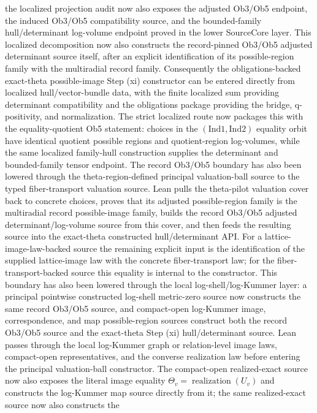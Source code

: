 \documentclass[11pt]{article}
\theoremstyle{plain}
\theoremstyle{definition}
\theoremstyle{remark}
\begin{document}
the localized projection audit now also exposes the adjusted Ob3/Ob5 endpoint,
the induced Ob3/Ob5 compatibility source, and the bounded-family
hull/determinant log-volume endpoint proved in the lower SourceCore layer.
This localized decomposition now also constructs the record-pinned Ob3/Ob5
adjusted determinant source itself, after an explicit identification of its
possible-region family with the multiradial record family.  Consequently the
obligations-backed exact-theta possible-image Step (xi) constructor can be
entered directly from localized hull/vector-bundle data, with the finite
localized sum providing determinant compatibility and the obligations package
providing the bridge, q-positivity, and normalization.
The strict localized route now packages this with the equality-quotient Ob5
statement: choices in the \((\mathrm{Ind}1,\mathrm{Ind}2)\) equality orbit
have identical quotient possible regions and quotient-region log-volumes, while
the same localized family-hull construction supplies the determinant and
bounded-family tensor endpoint.
The record Ob3/Ob5 boundary has also been lowered through the
theta-region-defined principal valuation-ball source to the typed
fiber-transport valuation source.  Lean pulls the theta-pilot valuation cover
back to concrete choices, proves that its adjusted possible-region family is
the multiradial record possible-image family, builds the record Ob3/Ob5
adjusted determinant/log-volume source from this cover, and then feeds the
resulting source into the exact-theta constructed hull/determinant API.  For a
lattice-image-law-backed source the remaining explicit input is the
identification of the supplied lattice-image law with the concrete
fiber-transport law; for the fiber-transport-backed source this equality is
internal to the constructor.  This boundary has also been lowered through the
local log-shell/log-Kummer layer: a principal pointwise constructed
log-shell metric-zero source now constructs the same record Ob3/Ob5 source,
and compact-open log-Kummer image, correspondence, and map possible-region
sources construct both the record Ob3/Ob5 source and the exact-theta Step (xi)
hull/determinant source.  Lean passes through the local log-Kummer graph or
relation-level image laws, compact-open representatives, and the converse
realization law before entering the principal valuation-ball constructor.  The
compact-open realized-exact source now also exposes the literal image equality
\(\Theta_v=\operatorname{realization}(U_v)\) and constructs the log-Kummer map
source directly from it; the same realized-exact source now also constructs the
\end{document}
